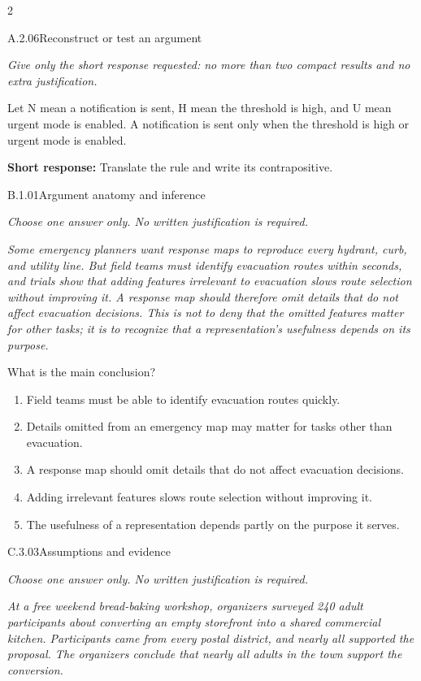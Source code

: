 \documentclass[9pt]{extarticle}
\newcommand{\choice}[1]{\item #1}
\begin{document}
\CoreWorkArea
\FormBreak
{}
\begin{multicols}{2}
\begin{DenseCoreProblem}{A.2.06}{Reconstruct or test an argument}
{\scriptsize\textit{Give only the short response requested: no more than two compact results and no extra justification.}\par}
Let N mean a notification is sent, H mean the threshold is high, and U mean urgent mode is enabled. A notification is sent only when the threshold is high or urgent mode is enabled.

\textbf{Short response:} Translate the rule and write its contrapositive.
\end{DenseCoreProblem}
\begin{DenseCoreProblem}{B.1.01}{Argument anatomy and inference}
{\scriptsize\textit{Choose one answer only. No written justification is required.}\par}
\emph{Some emergency planners want response maps to reproduce every hydrant, curb, and utility line. But field teams must identify evacuation routes within seconds, and trials show that adding features irrelevant to evacuation slows route selection without improving it. A response map should therefore omit details that do not affect evacuation decisions. This is not to deny that the omitted features matter for other tasks; it is to recognize that a representation's usefulness depends on its purpose.}

What is the main conclusion?
\begin{enumerate}[label=(\alph*)]
  \choice{Field teams must be able to identify evacuation routes quickly.}
  \choice{Details omitted from an emergency map may matter for tasks other than evacuation.}
  \choice{A response map should omit details that do not affect evacuation decisions.}
  \choice{Adding irrelevant features slows route selection without improving it.}
  \choice{The usefulness of a representation depends partly on the purpose it serves.}
\end{enumerate}
\end{DenseCoreProblem}
\columnbreak
\begin{DenseCoreProblem}{C.3.03}{Assumptions and evidence}
{\scriptsize\textit{Choose one answer only. No written justification is required.}\par}
\emph{At a free weekend bread-baking workshop, organizers surveyed 240 adult participants about converting an empty storefront into a shared commercial kitchen. Participants came from every postal district, and nearly all supported the proposal. The organizers conclude that nearly all adults in the town support the conversion.}


\end{DenseCoreProblem}
\end{multicols}
\end{document}
